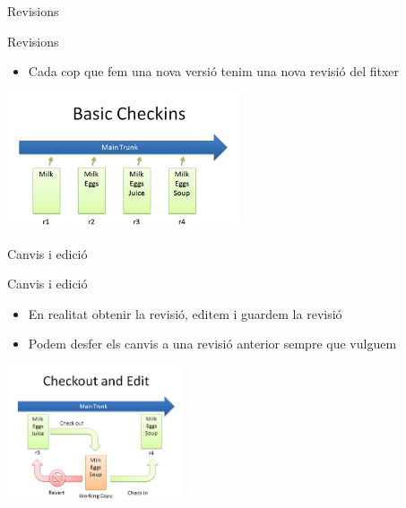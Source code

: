 \documentclass[10pt,xcolor={rgb}]{beamer}
\begin{document}
    \begin{frame}[fragile]{Revisions}
      
            \begin{block}{Revisions}
      
              \begin{itemize}
                \item Cada cop que fem una nova versió tenim una nova revisió del fitxer
              \end{itemize}

              \centering
              \includegraphics[height=4cm]{basic_checkin.png}
      
            \end{block}
      
    \end{frame}

    \begin{frame}[fragile]{Canvis i edició}
      
            \begin{block}{Canvis i edició}
      
              \begin{itemize}
                \item En realitat obtenir la revisió, editem i guardem la revisió
                \item Podem desfer els canvis a una revisió anterior sempre que vulguem
              \end{itemize}

              \centering
              \includegraphics[height=4cm]{checkout_edit.png}
      
            \end{block}
      
    \end{frame}
\end{document}
